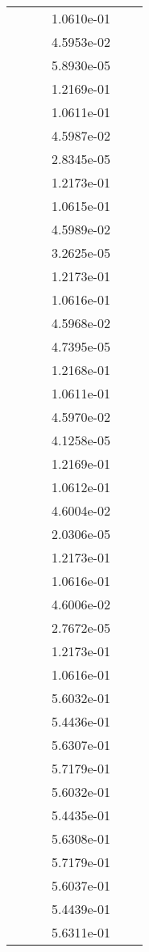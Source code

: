 \begin{xltabular}{\textwidth}{r|rS[table-format=1.3e+2]S[table-format=1.4e+2]S[table-format=1.4e+2]S[table-format=-1.5]}
&  &  & 1.0610e-01 & & \\
&  &  & 4.5953e-02 & & \\
&  &  & 5.8930e-05 & & \\
&  &  & 1.2169e-01 & & \\
&  &  & 1.0611e-01 & & \\
&  &  & 4.5987e-02 & & \\
&  &  & 2.8345e-05 & & \\
&  &  & 1.2173e-01 & & \\
&  &  & 1.0615e-01 & & \\
&  &  & 4.5989e-02 & & \\
&  &  & 3.2625e-05 & & \\
&  &  & 1.2173e-01 & & \\
&  &  & 1.0616e-01 & & \\
&  &  & 4.5968e-02 & & \\
&  &  & 4.7395e-05 & & \\
&  &  & 1.2168e-01 & & \\
&  &  & 1.0611e-01 & & \\
&  &  & 4.5970e-02 & & \\
&  &  & 4.1258e-05 & & \\
&  &  & 1.2169e-01 & & \\
&  &  & 1.0612e-01 & & \\
&  &  & 4.6004e-02 & & \\
&  &  & 2.0306e-05 & & \\
&  &  & 1.2173e-01 & & \\
&  &  & 1.0616e-01 & & \\
&  &  & 4.6006e-02 & & \\
&  &  & 2.7672e-05 & & \\
&  &  & 1.2173e-01 & & \\
&  &  & 1.0616e-01 & & \\
&  &  & 5.6032e-01 & & \\
&  &  & 5.4436e-01 & & \\
&  &  & 5.6307e-01 & & \\
&  &  & 5.7179e-01 & & \\
&  &  & 5.6032e-01 & & \\
&  &  & 5.4435e-01 & & \\
&  &  & 5.6308e-01 & & \\
&  &  & 5.7179e-01 & & \\
&  &  & 5.6037e-01 & & \\
&  &  & 5.4439e-01 & & \\
&  &  & 5.6311e-01 & & \\

\end{xltabular}
